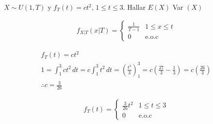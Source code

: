 \begin{Ejem}
$X\sim U \left(1,T \right) $ y $f_{T} \left( t \right) = ct^2$, $1\leq t \leq 3$. Hallar $E \left(X \right)$  Var $\left(X \right) $
 
 \smallskip
 
 \begin{eqnarray*}
f_{X|T} \left(x|T \right) = \begin{cases}
\frac{1}{T-1} & 1\leq x \leq t\\  
0 & \textrm {e.o.c}
\end{cases}  
\end{eqnarray*}

 \begin{eqnarray*}
f_{T}\left(t \right) = ct^{2}\\
1= \int_{1}^{3} ct^2\, dt = c \int_{1}^{3} t^2\, dt = \left( \frac{t^3}{3} \right)_{1}^{3}= c \left(\frac{27}{3} - \frac{1}{3} \right)= c \left(\frac{26}{3} \right)\\
\therefore c= \frac{3}{26}
\end{eqnarray*}

 \begin{eqnarray*}
f_{T} \left(t \right) = \begin{cases}
\frac{3}{26}t^{2} & 1\leq t \leq 3\\  
0 & \textrm {e.o.c}
\end{cases}  
\end{eqnarray*}
\end{Ejem}
